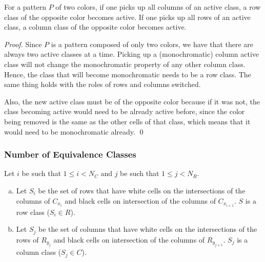 
\begin{proposition} 
\label{theorem_pick_up_altertation}
For a pattern $P$ of two colors, if one picks up all columns
of an active class, a row class of the opposite color becomes active. 
If one picks up all rows
of an active class, a column class of the opposite color becomes active. 
\end{proposition}


\begin{proof}
Since $P$ is a pattern composed of only two colors, we have that there are always two active classes at a time. Picking up a (monochromatic) column active class will not change the monochromatic property of any other column class. Hence, the class that will become monochromatic needs to be a row class. The same thing holds with the roles of rows and columns switched.

Also, the new active class must be of the opposite color because if it was not, the class becoming active would need to be already active before, since the color being removed is the same as the other cells of that class, which means that it would need to be monochromatic already.
\qed
\end{proof}


\subsubsection{Number of Equivalence Classes}

\begin{proposition} 
\label{theorem_difference_is_class}
Let $i$ be such that $1 \leq i < N_{C}$ and $j$ be such that $1 \leq j < N_{R}$.
\begin{enumerate}[a)]
\item Let $S_i$ be the set of rows that have white cells on the intersections of the columns of $C_{x_{i}}$ and black cells on intersection of the columns of $C_{x_{i+1}}$. $S$ is a row class ($S_i \in R$).
\item Let $S_j$ be the set of columns that have white cells on the intersections of the rows of $R_{y_{j}}$ and black cells on intersection of the columns of $R_{y_{j+1}}$. $S_j$ is a column class ($S_j \in C$).
\end{enumerate}
\end{proposition}

